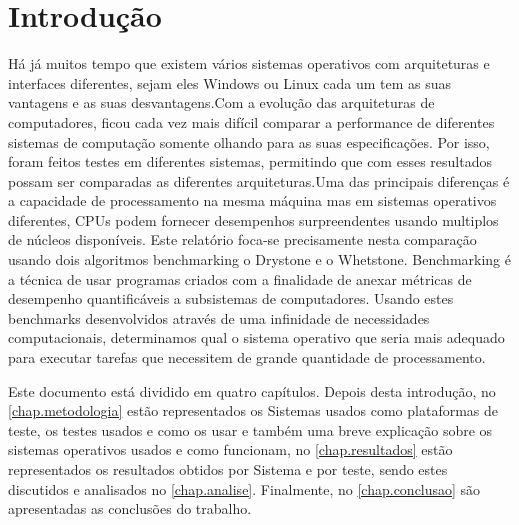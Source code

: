 \documentclass{report}
\begin{document}
\begin{comment}
\renewcommand{\abstractname}{Agradecimentos}
\begin{abstract}
Eventuais agradecimentos.
Comentar bloco caso não existam agradecimentos a fazer.
\end{abstract}
\end{comment}


\tableofcontents


\clearpage
{}

\chapter{Introdução}
\label{chap.introducao}
Há já muitos tempo que existem vários sistemas operativos com arquiteturas e interfaces diferentes, sejam eles Windows ou Linux cada um tem as suas vantagens e as suas desvantagens.Com a evolução das arquiteturas de computadores, ficou cada vez mais difícil comparar a performance de diferentes sistemas de computação somente olhando para as suas especificações. Por isso, foram feitos testes em diferentes sistemas, permitindo que com esses resultados possam ser comparadas as diferentes arquiteturas.Uma das principais diferenças é a capacidade de processamento na mesma máquina mas em sistemas operativos diferentes, CPUs podem fornecer
desempenhos surpreendentes usando multiplos de núcleos disponíveis. Este relatório foca-se precisamente nesta comparação usando dois algoritmos benchmarking o Drystone e o Whetstone.
Benchmarking é a técnica de usar programas criados com a finalidade de anexar métricas de desempenho quantificáveis a subsistemas de computadores. Usando estes benchmarks desenvolvidos através de uma infinidade de necessidades computacionais, determinamos qual o sistema operativo que seria mais adequado para executar tarefas que necessitem de grande quantidade de processamento.

Este documento está dividido em quatro capítulos.
Depois desta introdução,
no \autoref{chap.metodologia} estão representados os Sistemas usados como plataformas de teste, os testes usados e como os usar e também uma breve explicação sobre os sistemas operativos usados e como funcionam,
no \autoref{chap.resultados} estão representados os resultados obtidos por Sistema e por teste,
sendo estes discutidos e analisados no \autoref{chap.analise}.
Finalmente, no \autoref{chap.conclusao} são apresentadas
as conclusões do trabalho.
\end{document}
